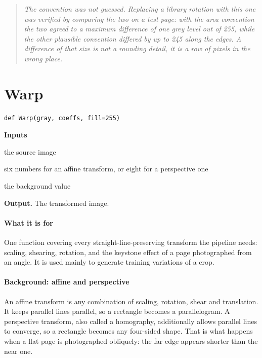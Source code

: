 \begin{quote}\small\itshape The convention was not guessed. Replacing a library rotation with this one was verified by comparing the two on a test page: with the area convention the two agreed to a maximum difference of one grey level out of 255, while the other plausible convention differed by up to 245 along the edges. A difference of that size is not a rounding detail, it is a row of pixels in the wrong place.\end{quote}

\section{Warp}
\begin{lstlisting}[style=sig]
def Warp(gray, coeffs, fill=255)
\end{lstlisting}

\noindent\textbf{Inputs}
\begin{description}[leftmargin=2.2em,style=nextline,font=\normalfont\ttfamily]\setlength\itemsep{1pt}
  \item[{img}] \normalfont the source image
  \item[{coeffs}] \normalfont six numbers for an affine transform, or eight for a perspective one
  \item[{fill}] \normalfont the background value
\end{description}

\noindent\textbf{Output.} The transformed image.


\paragraph{What it is for}
One function covering every straight-line-preserving transform the pipeline needs: scaling, shearing, rotation, and the keystone effect of a page photographed from an angle. It is used mainly to generate training variations of a crop.


\paragraph{Background: affine and perspective}
An affine transform is any combination of scaling, rotation, shear and translation. It keeps parallel lines parallel, so a rectangle becomes a parallelogram. A perspective transform, also called a homography, additionally allows parallel lines to converge, so a rectangle becomes any four-sided shape. That is what happens when a flat page is photographed obliquely: the far edge appears shorter than the near one.



